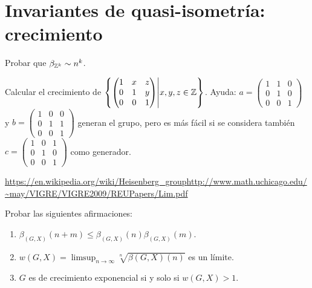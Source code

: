 \documentclass[twoside]{article}
\begin{document}
\newpage

\section{Invariantes de quasi-isometría: crecimiento}

\begin{ejercicio}{2.1}
Probar que $\beta_{\mathbb{Z}^k}\sim n^k$.
\end{ejercicio}
\begin{solucion}

\end{solucion}

\newpage

\begin{ejercicio}{2.2}
Calcular el crecimiento de $\left\{\begin{pmatrix}
1 & x & z\\
0 & 1 & y\\
0 & 0 & 1
\end{pmatrix}\middle\vert x,y,z\in\mathbb{Z}\right\}$. Ayuda: $a=\begin{pmatrix}
1 & 1 & 0\\
0 & 1 & 0\\
0 & 0 & 1
\end{pmatrix}$ y $b=\begin{pmatrix}
1 & 0 & 0\\
0 & 1 & 1\\
0 & 0 & 1
\end{pmatrix}$ generan el grupo, pero es más fácil si se considera también $c=\begin{pmatrix}
1 & 0 & 1\\
0 & 1 & 0\\
0 & 0 & 1
\end{pmatrix}$ como generador. 
\end{ejercicio}
\begin{solucion}
\url{https://en.wikipedia.org/wiki/Heisenberg_group}\url{http://www.math.uchicago.edu/~may/VIGRE/VIGRE2009/REUPapers/Lim.pdf}
\end{solucion}

\newpage

\begin{ejercicio}{2.3}
Probar las siguientes afirmaciones:
\begin{enumerate}
\item $\beta_{(G,X)}(n+m)\leq \beta_{(G,X)}(n)\beta_{(G,X)}(m)$.
\item $w(G,X)=\limsup_{n\to \infty}\sqrt[n]{\beta(G,X)(n)}$ es un límite. 
\item $G$ es de crecimiento exponencial si y solo si $w(G,X)>1$.
\end{enumerate}
\end{ejercicio}
\begin{solucion}

\end{solucion}
\end{document}
